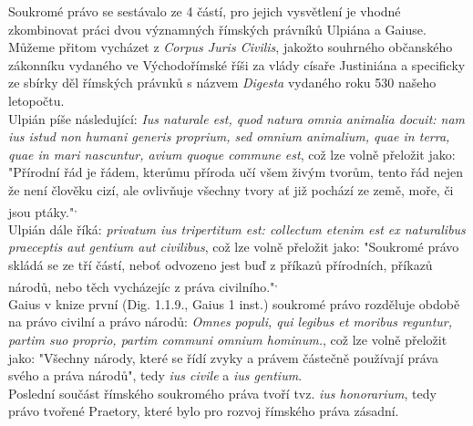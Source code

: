 \documentclass{article}
\begin{document}
Soukromé právo se sestávalo ze 4 částí, pro jejich vysvětlení je vhodné zkombinovat práci dvou významných římských právníků Ulpiána a Gaiuse. Můžeme přitom vycházet z \textit{Corpus Juris Civilis}, jakožto souhrného občanského zákonníku vydaného ve Východořímské říši za vlády císaře Justiniána a specificky ze sbírky děl římských právnků s názvem \textit{Digesta} vydaného roku 530 našeho letopočtu. \\


Ulpián píše následující: \textit{Ius naturale est, quod natura omnia animalia docuit: nam ius istud non humani generis proprium, sed omnium animalium, quae in terra, quae in mari nascuntur, avium quoque commune est}, což lze volně přeložit jako: "Přírodní řád je řádem, kterůmu příroda učí všem živým tvorům, tento řád nejen že není člověku cizí, ale ovlivňuje všechny tvory ať již pochází ze země, moře, či jsou ptáky."\textsuperscript{,} \\

Ulpián dále říká: \textit{privatum ius tripertitum est: collectum etenim est ex naturalibus praeceptis aut gentium aut civilibus}, což lze volně přeložit jako: "Soukromé právo skládá se ze tří částí, neboť odvozeno jest buď z příkazů přírodních, příkazů národů, nebo těch vycházejíc z práva civilního."\textsuperscript{,} \\

Gaius v knize první (Dig. 1.1.9., Gaius 1 inst.) soukromé právo rozděluje obdobě na právo civilní a právo národů: \textit{Omnes populi, qui legibus et moribus reguntur, partim suo proprio, partim communi omnium hominum.}, což lze volně přeložit jako: "Všechny národy, které se řídí zvyky a právem částečně používají práva svého a práva národů", tedy \textit{ius civile} a \textit{ius gentium}. \\

Poslední součást římského soukromého práva tvoří tvz. \textit{ius honorarium}, tedy právo tvořené Praetory, které bylo pro rozvoj římského práva zásadní. \\
\end{document}
